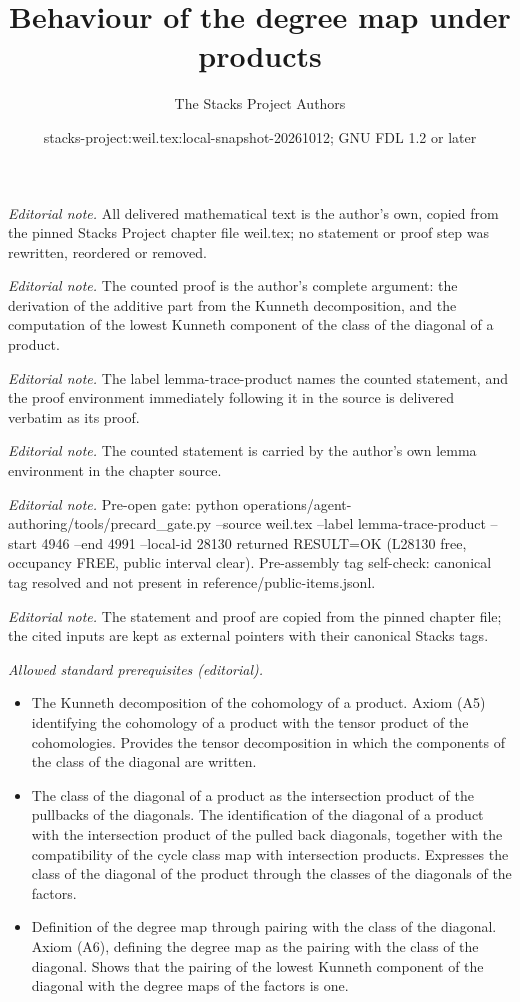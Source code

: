 \documentclass[10pt,a4paper]{amsart}
\title{Behaviour of the degree map under products}
\author{The Stacks Project Authors}
\date{stacks-project:weil.tex:local-snapshot-20261012; GNU FDL 1.2 or later}
\theoremstyle{plain}
\theoremstyle{definition}
\theoremstyle{remark}
\numberwithin{equation}{subsection}
\begin{document}
\maketitle
\noindent\textit{Editorial note.} All delivered mathematical text is the author's own, copied from the pinned Stacks Project chapter file weil.tex; no statement or proof step was rewritten, reordered or removed.\par\medskip
\noindent\textit{Editorial note.} The counted proof is the author's complete argument: the derivation of the additive part from the Kunneth decomposition, and the computation of the lowest Kunneth component of the class of the diagonal of a product.\par\medskip
\noindent\textit{Editorial note.} The label lemma-trace-product names the counted statement, and the proof environment immediately following it in the source is delivered verbatim as its proof.\par\medskip
\noindent\textit{Editorial note.} The counted statement is carried by the author's own lemma environment in the chapter source.\par\medskip
\noindent\textit{Editorial note.} Pre-open gate: python operations/agent-authoring/tools/precard\_gate.py --source weil.tex --label lemma-trace-product --start 4946 --end 4991 --local-id 28130 returned RESULT=OK (L28130 free, occupancy FREE, public interval clear). Pre-assembly tag self-check: canonical tag resolved and not present in reference/public-items.jsonl.\par\medskip
\noindent\textit{Editorial note.} The statement and proof are copied from the pinned chapter file; the cited inputs are kept as external pointers with their canonical Stacks tags.\par\medskip
\noindent\textit{Allowed standard prerequisites (editorial).}\begin{itemize}
\item The Kunneth decomposition of the cohomology of a product. Axiom (A5) identifying the cohomology of a product with the tensor product of the cohomologies. Provides the tensor decomposition in which the components of the class of the diagonal are written.
\item The class of the diagonal of a product as the intersection product of the pullbacks of the diagonals. The identification of the diagonal of a product with the intersection product of the pulled back diagonals, together with the compatibility of the cycle class map with intersection products. Expresses the class of the diagonal of the product through the classes of the diagonals of the factors.
\item Definition of the degree map through pairing with the class of the diagonal. Axiom (A6), defining the degree map as the pairing with the class of the diagonal. Shows that the pairing of the lowest Kunneth component of the diagonal with the degree maps of the factors is one.
\end{itemize}\medskip
\end{document}
